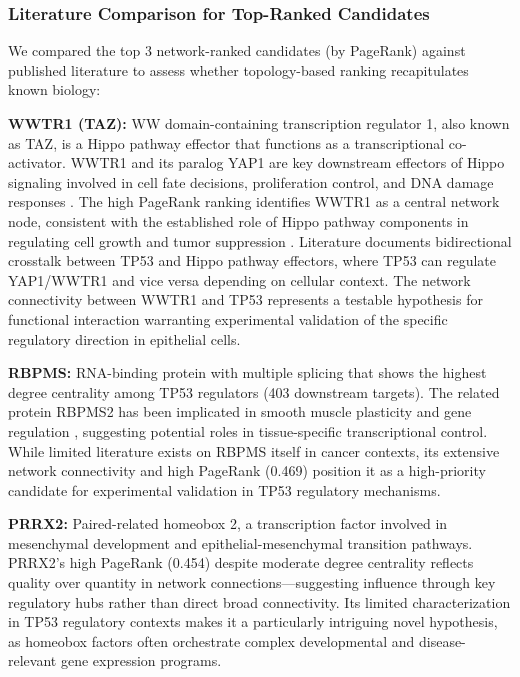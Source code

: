 \documentclass[11pt]{article}
\begin{document}
\subsubsection{Literature Comparison for Top-Ranked Candidates}

We compared the top 3 network-ranked candidates (by PageRank) against published literature to assess whether topology-based ranking recapitulates known biology:

\textbf{WWTR1 (TAZ):} WW domain-containing transcription regulator 1, also known as TAZ, is a Hippo pathway effector that functions as a transcriptional co-activator. WWTR1 and its paralog YAP1 are key downstream effectors of Hippo signaling involved in cell fate decisions, proliferation control, and DNA damage responses \cite{yap2005,yap2008}. The high PageRank ranking identifies WWTR1 as a central network node, consistent with the established role of Hippo pathway components in regulating cell growth and tumor suppression \cite{hippo2019,hippo2011}. Literature documents bidirectional crosstalk between TP53 and Hippo pathway effectors, where TP53 can regulate YAP1/WWTR1 and vice versa depending on cellular context. The network connectivity between WWTR1 and TP53 represents a testable hypothesis for functional interaction warranting experimental validation of the specific regulatory direction in epithelial cells.

\textbf{RBPMS:} RNA-binding protein with multiple splicing that shows the highest degree centrality among TP53 regulators (403 downstream targets). The related protein RBPMS2 has been implicated in smooth muscle plasticity and gene regulation \cite{rbpms2014}, suggesting potential roles in tissue-specific transcriptional control. While limited literature exists on RBPMS itself in cancer contexts, its extensive network connectivity and high PageRank (0.469) position it as a high-priority candidate for experimental validation in TP53 regulatory mechanisms.

\textbf{PRRX2:} Paired-related homeobox 2, a transcription factor involved in mesenchymal development and epithelial-mesenchymal transition pathways. PRRX2's high PageRank (0.454) despite moderate degree centrality reflects quality over quantity in network connections---suggesting influence through key regulatory hubs rather than direct broad connectivity. Its limited characterization in TP53 regulatory contexts makes it a particularly intriguing novel hypothesis, as homeobox factors often orchestrate complex developmental and disease-relevant gene expression programs.
\end{document}
